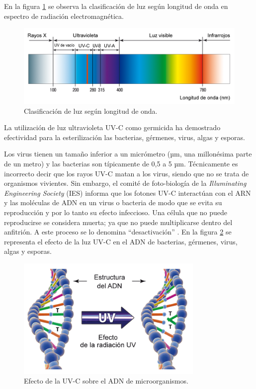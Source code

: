 En la  figura \ref{fig:espectro} se observa la  clasificación de luz según longitud de onda en  espectro de radiación electromagnética.


\begin{figure}[h]
	\centering
	\includegraphics[width=14cm]{./Figures/espectro.PNG}
	\caption{Clasificación de luz según longitud de onda\protect\footnotemark.}
	\label{fig:espectro}
\end{figure}

La utilización de luz ultravioleta UV-C como germicida ha demostrado efectividad para la esterilización  las bacterias, gérmenes, virus, algas y esporas. 

Los virus tienen un tamaño inferior a un micrómetro (µm, una millonésima parte de un metro) y las bacterias son típicamente de 0,5 a 5 µm. Técnicamente es incorrecto decir que los rayos  UV-C matan a los virus, siendo que no se trata de organismos vivientes. Sin embargo, el comité de foto-biología de la \emph{ Illuminating Engineering Society} (IES) informa que los fotones UV-C interactúan con el ARN y las moléculas de ADN en un virus o bacteria de modo que se evita su reproducción y por lo tanto su efecto infeccioso. Una célula que no puede reproducirse se considera muerta; ya que no puede multiplicarse dentro del anfitrión. A este proceso se lo denomina “desactivación”   \citep{IES}. En la figura \ref{fig:adn} se representa el efecto de la luz UV-C en el ADN de bacterias, gérmenes, virus, algas y esporas. 
 

\begin{figure}[h]
	\centering
	\includegraphics[width=9cm]{./Figures/adn.png}
	\caption{Efecto de la UV-C sobre el ADN de microorganismos\protect\footnotemark.}
	\label{fig:adn}
\end{figure}

